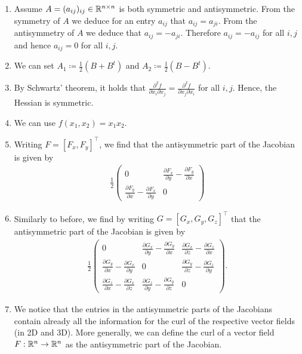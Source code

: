 \documentclass[11pt]{article}
\begin{document}
\begin{solution}
    \begin{enumerate}
     \item Assume $A = (a_{ij})_{ij} \in \mathbb{R}^{n \times n}$ is both symmetric and antisymmetric. From the symmetry of $A$ we deduce for an entry $a_{ij}$ that $a_{ij} = a_{ji}$.
     From the antisymmetry of $A$ we deduce that $a_{ij} = -a_{ji}$.
     Therefore $a_{ij} = -a_{ij}$ for all $i,j$ and hence $a_{ij} = 0$ for all $i,j$.
     \item We can set $A_1 \coloneqq \frac{1}{2}(B + B^{t})$ and $A_2 \coloneqq \frac{1}{2}(B - B^{t})$.
     \item By Schwartz' theorem, it holds that $\frac{\partial^2 f}{\partial x_i \partial x_j} = \frac{\partial^2 f}{\partial x_j \partial x_i}$ for all $i,j$. Hence, the Hessian is symmetric.
     \item We can use $f(x_1,x_2) = x_1 x_2$.
     \item Writing $F = [F_x, F_y]^\top$, we find that the antisymmetric part of the Jacobian is given by
     \begin{align*}
        \frac{1}{2}
            \begin{pmatrix}
                0 & \frac{\partial F_x}{\partial y} -  \frac{\partial F_y}{\partial x}\\
                \frac{\partial F_y}{\partial x} - \frac{\partial F_x}{\partial y} & 0
            \end{pmatrix}
     \end{align*}
     \item Similarly to before, we find by writing $G = [G_x, G_y, G_z]^\top$ that the antisymmetric part of the Jacobian is given by
        \begin{align*}
            \frac{1}{2}
                \begin{pmatrix}
                    0 & \frac{\partial G_x}{\partial y} -  \frac{\partial G_y}{\partial x} & \frac{\partial G_x}{\partial z} -  \frac{\partial G_z}{\partial x}\\
                    \frac{\partial G_y}{\partial x} - \frac{\partial G_x}{\partial y} & 0 & \frac{\partial G_y}{\partial z} -  \frac{\partial G_z}{\partial y}\\
                    \frac{\partial G_z}{\partial x} -  \frac{\partial G_x}{\partial z} & \frac{\partial G_z}{\partial y} -  \frac{\partial G_y}{\partial z} & 0
                \end{pmatrix}.
        \end{align*}
     \item We notice that the entries in the antisymmetric parts of the Jacobians contain already all the information for the curl of the respective vector fields (in 2D and 3D). More generally, we can define the curl of a vector field $F : \mathbb{R}^{n} \rightarrow \mathbb{R}^{n}$ as the antisymmetric part of the Jacobian.
    \end{enumerate}
\end{solution}
\end{document}

